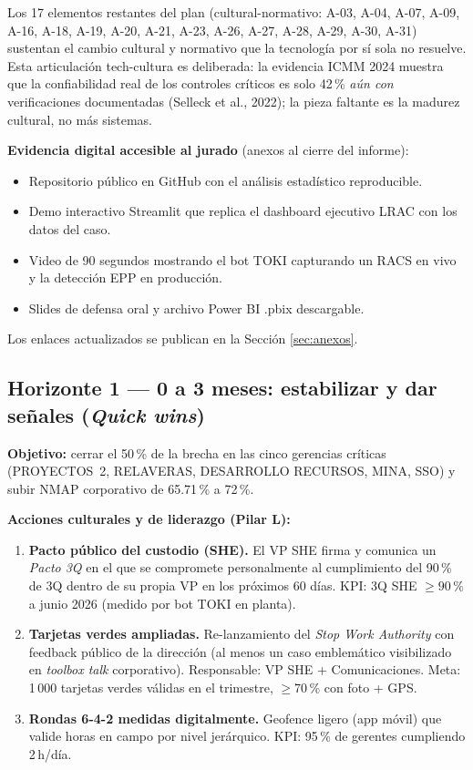 \documentclass[12pt,a4paper]{article}
\begin{document}
Los 17 elementos restantes del plan (cultural-normativo: A-03, A-04, A-07, A-09, A-16, A-18, A-19, A-20, A-21, A-23, A-26, A-27, A-28, A-29, A-30, A-31) sustentan el cambio cultural y normativo que la tecnología por sí sola no resuelve. Esta articulación tech-cultura es deliberada: la evidencia ICMM 2024 muestra que la confiabilidad real de los controles críticos es solo 42\,\% \emph{aún con} verificaciones documentadas (Selleck et al., 2022); la pieza faltante es la madurez cultural, no más sistemas.

\textbf{Evidencia digital accesible al jurado} (anexos al cierre del informe):
\begin{itemize}\setlength\itemsep{1pt}
\item Repositorio público en GitHub con el análisis estadístico reproducible.
\item Demo interactivo Streamlit que replica el dashboard ejecutivo LRAC con los datos del caso.
\item Video de 90 segundos mostrando el bot TOKI capturando un RACS en vivo y la detección EPP en producción.
\item Slides de defensa oral y archivo Power BI .pbix descargable.
\end{itemize}

Los enlaces actualizados se publican en la Sección \ref{sec:anexos}.

\subsection{Horizonte 1 --- 0 a 3 meses: estabilizar y dar señales (\emph{Quick wins})}

\begin{kbox}
\textbf{Objetivo:} cerrar el 50\,\% de la brecha en las cinco gerencias críticas (PROYECTOS~2, RELAVERAS, DESARROLLO RECURSOS, MINA, SSO) y subir NMAP corporativo de 65.71\,\% a 72\,\%.
\end{kbox}

\textbf{Acciones culturales y de liderazgo (Pilar L):}
\begin{enumerate}
\item \textbf{Pacto público del custodio (SHE).} El VP SHE firma y comunica un \emph{Pacto 3Q} en el que se compromete personalmente al cumplimiento del 90\,\% de 3Q dentro de su propia VP en los próximos 60 días. KPI: 3Q SHE $\geq 90\,\%$ a junio 2026 (medido por bot TOKI en planta).
\item \textbf{Tarjetas verdes ampliadas.} Re-lanzamiento del \emph{Stop Work Authority} con feedback público de la dirección (al menos un caso emblemático visibilizado en \emph{toolbox talk} corporativo). Responsable: VP SHE + Comunicaciones. Meta: 1\,000 tarjetas verdes válidas en el trimestre, $\geq$70\,\% con foto + GPS.
\item \textbf{Rondas 6-4-2 medidas digitalmente.} Geofence ligero (app móvil) que valide horas en campo por nivel jerárquico. KPI: 95\,\% de gerentes cumpliendo 2\,h/día.
\end{enumerate}
\end{document}
